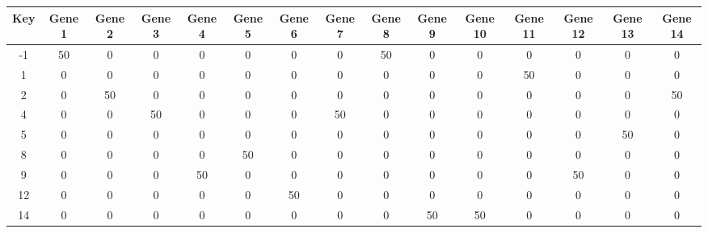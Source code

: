 \begin{tabular}{|c|c|c|c|c|c|c|c|c|c|c|c|c|c|c|}
\hline
Key & Gene 1 & Gene 2 & Gene 3 & Gene 4 & Gene 5 & Gene 6 & Gene 7 & Gene 8 & Gene 9 & Gene 10 & Gene 11 & Gene 12 & Gene 13 & Gene 14 \\
\hline
-1 & 50 & 0 & 0 & 0 & 0 & 0 & 0 & 50 & 0 & 0 & 0 & 0 & 0 & 0 \\
1 & 0 & 0 & 0 & 0 & 0 & 0 & 0 & 0 & 0 & 0 & 50 & 0 & 0 & 0 \\
2 & 0 & 50 & 0 & 0 & 0 & 0 & 0 & 0 & 0 & 0 & 0 & 0 & 0 & 50 \\
4 & 0 & 0 & 50 & 0 & 0 & 0 & 50 & 0 & 0 & 0 & 0 & 0 & 0 & 0 \\
5 & 0 & 0 & 0 & 0 & 0 & 0 & 0 & 0 & 0 & 0 & 0 & 0 & 50 & 0 \\
8 & 0 & 0 & 0 & 0 & 50 & 0 & 0 & 0 & 0 & 0 & 0 & 0 & 0 & 0 \\
9 & 0 & 0 & 0 & 50 & 0 & 0 & 0 & 0 & 0 & 0 & 0 & 50 & 0 & 0 \\
12 & 0 & 0 & 0 & 0 & 0 & 50 & 0 & 0 & 0 & 0 & 0 & 0 & 0 & 0 \\
14 & 0 & 0 & 0 & 0 & 0 & 0 & 0 & 0 & 50 & 50 & 0 & 0 & 0 & 0 \\
\hline
\end{tabular}